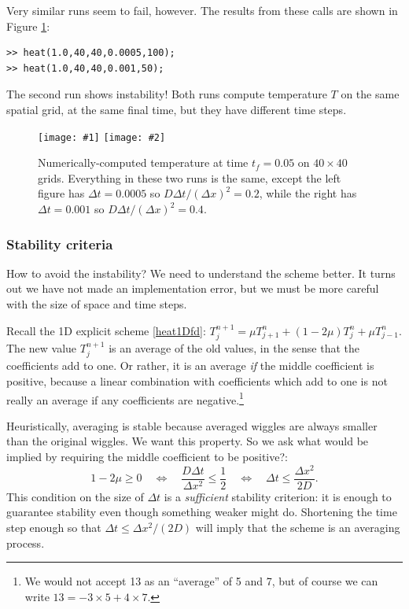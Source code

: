\documentclass[titlepage,letterpaper,final,12pt]{scrartcl}
\newcommand{\minput}[1]{
\bigskip
\begin{quote}
\bigskip
\VerbatimInput[frame=single,framesep=3mm,label=\fbox{\normalsize \textsl{\,#1.m\,}},fontfamily=courier,fontsize=\scriptsize]{../mfiles/#1.slim.m}
\bigskip
\end{quote}
}
\newcommand{\twofigsizes}[5]{
\begin{figure}[ht]
\centering
\texttt{[image: \#1]} \quad
\texttt{[image: \#2]}
\caption{#3}
\label{fig:#1}
\end{figure}}
\newcommand{\twofig}[3]{\twofigsizes{#1}{#2}{#3}{2.5in}{2.5in}}
\begin{document}
\minput{heat}

Very similar runs seem to fail, however.  The results from these calls are shown in Figure \ref{fig:stability}:
\begin{Verbatim}
>> heat(1.0,40,40,0.0005,100);
>> heat(1.0,40,40,0.001,50);
\end{Verbatim}
The second run shows instability!  Both runs compute temperature $T$ on the same spatial grid, at the same final time, but they have different time steps.

\twofig{stability}{instability}{Numerically-computed temperature at time $t_f=0.05$ on $40\times 40$ grids.  Everything in these two runs is the same, except the left figure has $\Delta t=0.0005$ so $D\Delta t/(\Delta x)^2= 0.2$, while the right has $\Delta t=0.001$ so $D\Delta t/(\Delta x)^2= 0.4$.}

\subsubsection*{Stability criteria}  How to avoid the instability?  We need to understand the scheme better.  It turns out we have not made an implementation error, but we must be more careful with the size of space and time steps.

Recall the 1D explicit scheme \eqref{heat1Dfd}: $T_j^{n+1} = \mu T_{j+1}^n + (1 - 2 \mu) T_j^n + \mu T_{j-1}^n$.  The new value $T_j^{n+1}$ is an average of the old values, in the sense that the coefficients add to one.  Or rather, it is an average \emph{if} the middle coefficient is positive, because a linear combination with coefficients which add to one is not really an average if any coefficients are negative.\footnote{We would not accept 13 as an ``average'' of 5 and 7, but of course we can write $13 = -3 \times 5 + 4 \times 7$.}

Heuristically, averaging is stable because averaged wiggles are always smaller than the original wiggles.  We want this property.  So we ask what would be implied by requiring the middle coefficient to be positive?:
\begin{equation}
   1 - 2 \mu \ge 0 \quad \iff \quad \frac{D\Delta t}{\Delta x^2} \le \frac{1}{2} \quad \iff \quad \Delta t \le \frac{\Delta x^2}{2 D}.  \label{stabcrit}
\end{equation}
This condition on the size of $\Delta t$ is a \emph{sufficient} stability criterion: it is enough to guarantee stability even though something weaker might do.  Shortening the time step enough so that $\Delta t \le \Delta x^2/(2 D)$ will imply that the scheme is an averaging process.
\end{document}
